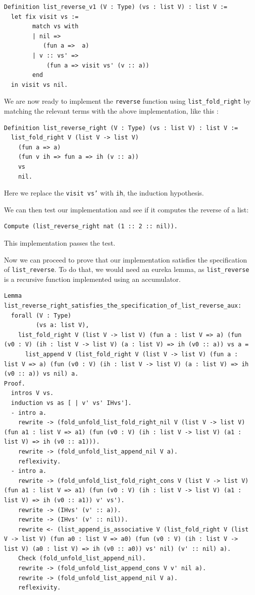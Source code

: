 \documentclass{article}
\begin{document}
\begin{lstlisting}
Definition list_reverse_v1 (V : Type) (vs : list V) : list V :=
  let fix visit vs :=
        match vs with
        | nil =>
           (fun a =>  a)
        | v :: vs' =>
            (fun a => visit vs' (v :: a))
        end
  in visit vs nil.
\end{lstlisting}

We are now ready to implement the \texttt{reverse} function using \texttt{list\_fold\_right} by matching the relevant terms with the above implementation, like this :

\begin{lstlisting}
Definition list_reverse_right (V : Type) (vs : list V) : list V :=
  list_fold_right V (list V -> list V)
    (fun a => a)
    (fun v ih => fun a => ih (v :: a))
    vs
    nil.
\end{lstlisting}

Here we replace the \texttt{visit vs'} with \texttt{ih}, the induction hypothesis.

We can then test our implementation and see if it computes the reverse of a list:

\begin{lstlisting}
Compute (list_reverse_right nat (1 :: 2 :: nil)).
\end{lstlisting}

This implementation passes the test.

Now we can proceed to prove that our implementation satisfies the specification of \texttt{list\_reverse}. To do that, we would need an eureka lemma, as \texttt{list\_reverse} is a recursive function implemented using an accumulator. 

\begin{lstlisting}
Lemma list_reverse_right_satisfies_the_specification_of_list_reverse_aux:
  forall (V : Type)
         (vs a: list V),
    list_fold_right V (list V -> list V) (fun a : list V => a) (fun (v0 : V) (ih : list V -> list V) (a : list V) => ih (v0 :: a)) vs a =
      list_append V (list_fold_right V (list V -> list V) (fun a : list V => a) (fun (v0 : V) (ih : list V -> list V) (a : list V) => ih (v0 :: a)) vs nil) a.
Proof.
  intros V vs.
  induction vs as [ | v' vs' IHvs'].
  - intro a.
    rewrite -> (fold_unfold_list_fold_right_nil V (list V -> list V) (fun a1 : list V => a1) (fun (v0 : V) (ih : list V -> list V) (a1 : list V) => ih (v0 :: a1))).
    rewrite -> (fold_unfold_list_append_nil V a).
    reflexivity.
  - intro a.
    rewrite -> (fold_unfold_list_fold_right_cons V (list V -> list V) (fun a1 : list V => a1) (fun (v0 : V) (ih : list V -> list V) (a1 : list V) => ih (v0 :: a1)) v' vs').
    rewrite -> (IHvs' (v' :: a)).
    rewrite -> (IHvs' (v' :: nil)).
    rewrite <- (list_append_is_associative V (list_fold_right V (list V -> list V) (fun a0 : list V => a0) (fun (v0 : V) (ih : list V -> list V) (a0 : list V) => ih (v0 :: a0)) vs' nil) (v' :: nil) a).
    Check (fold_unfold_list_append_nil).
    rewrite -> (fold_unfold_list_append_cons V v' nil a).
    rewrite -> (fold_unfold_list_append_nil V a).
    reflexivity.
\end{lstlisting}
\end{document}
